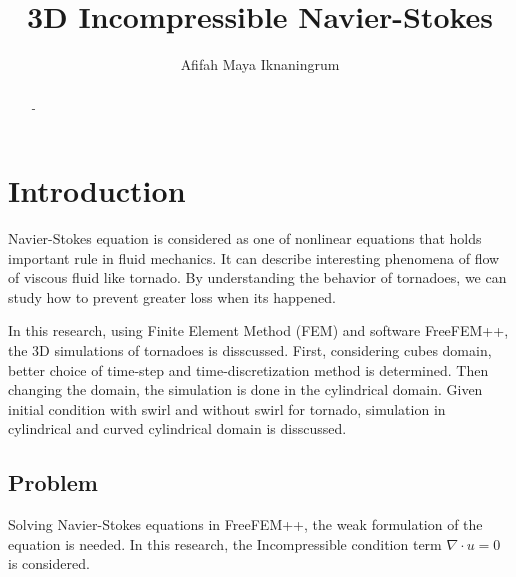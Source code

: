 \documentclass[a4paper]{article}
\title{3D Incompressible Navier-Stokes}
\author{Afifah Maya Iknaningrum}
\begin{document}

\maketitle

\begin{abstract}
-
\end{abstract}

\section{Introduction}

Navier-Stokes equation is considered as one of nonlinear equations that holds important rule in fluid mechanics. It can describe interesting phenomena of flow of viscous fluid like tornado. By understanding the behavior of tornadoes, we can study how to prevent greater loss when its happened.

In this research, using Finite Element Method (FEM) and software FreeFEM++, the 3D simulations of tornadoes is disscussed. First, considering cubes domain, better choice of time-step and time-discretization method is determined. Then changing the domain, the simulation is done in the cylindrical domain. Given initial condition with swirl and without swirl for tornado, simulation in cylindrical and curved cylindrical domain is disscussed.

\subsection{Problem}
Solving Navier-Stokes equations in FreeFEM++, the weak formulation of the equation is needed. In this research, the Incompressible condition term $ \nabla \cdot u = 0 $ is considered.
\end{document}
